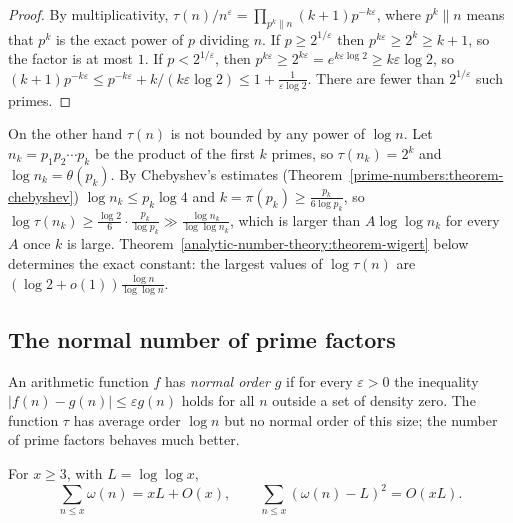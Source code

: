 \begin{proof}
By multiplicativity, $\tau(n)/n^\varepsilon = \prod_{p^k \| n}(k + 1)p^{-k\varepsilon}$, where $p^k \| n$ means that $p^k$ is the exact power of $p$ dividing $n$. If $p \geq 2^{1/\varepsilon}$ then
$p^{k\varepsilon} \geq 2^k \geq k + 1$, so the factor is at most $1$. If $p < 2^{1/\varepsilon}$, then $p^{k\varepsilon} \geq 2^{k\varepsilon} = e^{k\varepsilon\log 2} \geq k\varepsilon\log 2$, so
$(k + 1)p^{-k\varepsilon} \leq p^{-k\varepsilon} + k/(k\varepsilon\log 2) \leq 1 + \frac{1}{\varepsilon\log 2}$. There are fewer than $2^{1/\varepsilon}$ such primes.
\end{proof}

\begin{remark}\label{analytic-number-theory:remark-divisor-not-polylog}
On the other hand $\tau(n)$ is not bounded by any power of $\log n$. Let $n_k = p_1p_2\cdots p_k$ be the product of the first $k$ primes, so $\tau(n_k) = 2^k$ and $\log n_k = \theta(p_k)$. By
Chebyshev's estimates (Theorem~\ref{prime-numbers:theorem-chebyshev}) $\log n_k \leq p_k\log 4$ and $k = \pi(p_k) \geq \frac{p_k}{6\log p_k}$, so
$\log\tau(n_k) \geq \frac{\log 2}{6}\cdot\frac{p_k}{\log p_k} \gg \frac{\log n_k}{\log\log n_k}$, which is larger than $A\log\log n_k$ for every $A$ once $k$ is large. Theorem~\ref{analytic-number-theory:theorem-wigert}
below determines the exact constant: the largest values of $\log\tau(n)$ are $(\log 2 + o(1))\frac{\log n}{\log\log n}$.
\end{remark}

\subsection{The normal number of prime factors}\label{analytic-number-theory:subsection-normal-order}

An arithmetic function $f$ has \emph{normal order} $g$ if for every $\varepsilon > 0$ the inequality $|f(n) - g(n)| \leq \varepsilon g(n)$ holds for all $n$ outside a set of density zero. The function
$\tau$ has average order $\log n$ but no normal order of this size; the number of prime factors behaves much better.

\begin{theorem}[Tur\'an]\label{analytic-number-theory:theorem-turan}
For $x \geq 3$, with $L = \log\log x$,
\[
\sum_{n \leq x}\omega(n) = xL + O(x), \qquad \sum_{n \leq x}(\omega(n) - L)^2 = O(xL).
\]
\end{theorem}


